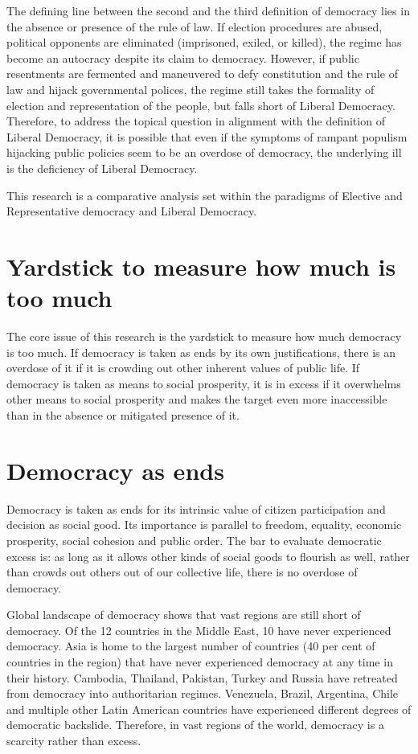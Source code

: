 \documentclass{scrartcl}
\begin{document}
\bigskip{}

The defining line between the second and the third definition of democracy
lies in the absence or presence of the rule of law. If election procedures
are abused, political opponents are eliminated (imprisoned, exiled,
or killed), the regime has become an autocracy despite its claim to
democracy. However, if public resentments are fermented and maneuvered
to defy constitution and the rule of law and hijack governmental polices,
the regime still takes the formality of election and representation
of the people, but falls short of Liberal Democracy. Therefore, to
address the topical question in alignment with the definition of Liberal
Democracy, it is possible that even if the symptoms of rampant populism
hijacking public policies seem to be an overdose of democracy, the
underlying ill is the deficiency of Liberal Democracy.

This research is a comparative analysis set within the paradigms of
Elective and Representative democracy and Liberal Democracy. 

\section{Yardstick to measure how much is too much}

The core issue of this research is the yardstick to measure how much
democracy is too much. If democracy is taken as ends by its
own justifications, there is an overdose of it if it is crowding out
other inherent values of public life. If democracy is taken
as means to social prosperity, it is in excess if it overwhelms other
means to social prosperity and makes the target even more inaccessible
than in the absence or mitigated presence of it. 

\section{Democracy as ends}

Democracy is taken as ends for its intrinsic value of citizen participation
and decision as social good. Its importance is parallel to freedom,
equality, economic prosperity, social cohesion and public order. The
bar to evaluate democratic excess is: as long as it allows other kinds
of social goods to flourish as well, rather than crowds out others
out of our collective life, there is no overdose of democracy. 

Global landscape of democracy shows that vast regions are still short
of democracy. Of the 12 countries in the Middle East, 10 have never
experienced democracy. Asia is home to the largest number of countries
(40 per cent of countries in the region) that have never experienced
democracy at any time in their history. 
Cambodia,
Thailand,
Pakistan,
Turkey and Russia have retreated from democracy into authoritarian regimes.
Venezuela, Brazil, Argentina,
Chile and multiple other Latin American countries have experienced
different degrees of democratic backslide\autocite{IDEA}. Therefore, in vast
regions of the world, democracy is a scarcity rather than excess. 
\end{document}
